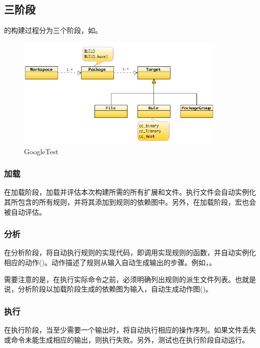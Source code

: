 \begin{content}

\subsection{三阶段}

的构建过程分为三个阶段，如。

\begin{figure}[H]
\centering
\includegraphics[width=0.9\textwidth]{figures/bazel-domain-model.png}
\caption{GoogleTest}
 \label{fig:bazel-concept-eval-model}
\end{figure}

\subsubsection{加载}

在加载阶段，加载并评估本次构建所需的所有扩展和文件。执行文件会自动实例化其所包含的所有规则，并将其添加到规则的依赖图中。另外，在加载阶段，宏也会被自动评估。

\subsubsection{分析}

在分析阶段，将自动执行规则的实现代码，即调用实现规则的函数，并自动实例化相应的动作()。动作描述了规则从输入自动生成输出的步骤。例如，。

需要注意的是，在执行实际命令之前，必须明确列出规则的派生文件列表。也就是说，分析阶段以加载阶段生成的依赖图为输入，自动生成动作图()。

\subsubsection{执行}

在执行阶段，当至少需要一个输出时，将自动执行相应的操作序列。如果文件丢失或命令未能生成相应的输出，则执行失败。另外，测试也在执行阶段自动运行。

\end{content}
